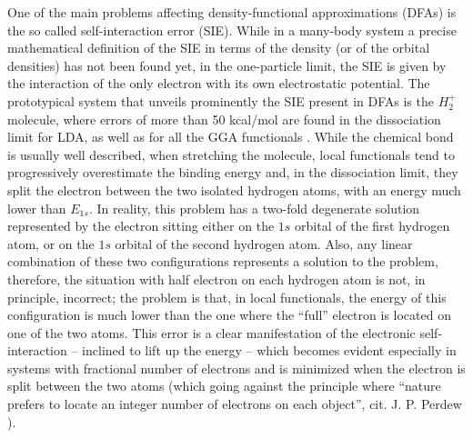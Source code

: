 One of the main problems affecting density-functional approximations (DFAs) is the so called self-interaction error (SIE). While in a many-body system a precise mathematical definition of the SIE in terms of the density (or of the orbital densities) has not been found yet, in the one-particle limit, the SIE is given by the interaction of the only electron with its own electrostatic potential. The prototypical system that unveils prominently the SIE present in DFAs is the $H_2^+$ molecule, where errors of more than 50 kcal/mol are found in the dissociation limit for LDA, as well as for all the GGA functionals \cite{cohen_challenges_2012}. While the chemical bond is usually well described, when stretching the molecule, local functionals tend to progressively overestimate the binding energy and, in the dissociation limit, they split the electron between the two isolated hydrogen atoms, with an energy much lower than $E_{1s}$. In reality, this problem has a two-fold degenerate solution represented by the electron sitting either on the $1s$ orbital of the first hydrogen atom, or on the $1s$ orbital of the second hydrogen atom. Also, any linear combination of these two configurations represents a solution to the problem, therefore, the situation with half electron on each hydrogen atom is not, in principle, incorrect; the problem is that, in local functionals, the energy of this configuration is much lower than the one where the ``full'' electron is located on one of the two atoms. This error is a clear manifestation of the electronic self-interaction -- inclined to lift up the energy -- which becomes evident especially in systems with fractional number of electrons and is minimized when the electron is split between the two atoms (which going against the principle where ``nature prefers to locate an integer number of electrons on each object'', cit. J. P. Perdew \cite{perdew_size-consistency_1990}).

